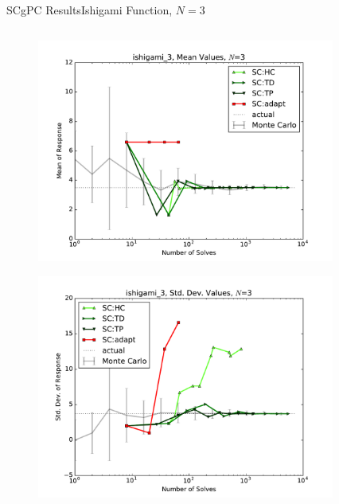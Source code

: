 \documentclass{beamer}
\begin{document}
\begin{frame}{SCgPC Results}{Ishigami Function, $N=3$}\vspace{-20pt}
 \begin{columns}
   \begin{column}{0.5\textwidth}
        \begin{figure}[h!]
          \centering
          \includegraphics[width=0.8\linewidth]{anlmodels/ishigami_3_mean_vals_nohdmr}
        \end{figure}
        \vspace{-20pt}
        \begin{figure}[h!]
          \centering
          \includegraphics[width=0.8\linewidth]{anlmodels/ishigami_3_var_vals_nohdmr}
        \end{figure}
   \end{column}
   \begin{column}{0.5\textwidth}
        \begin{figure}[h!]
          \centering

\end{figure}
\end{column}
\end{columns}
\end{frame}
\end{document}
